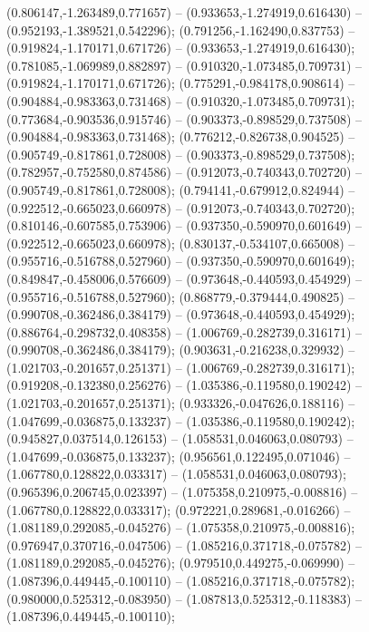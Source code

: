  (0.806147,-1.263489,0.771657) -- (0.933653,-1.274919,0.616430) -- (0.952193,-1.389521,0.542296);
 (0.791256,-1.162490,0.837753) -- (0.919824,-1.170171,0.671726) -- (0.933653,-1.274919,0.616430);
 (0.781085,-1.069989,0.882897) -- (0.910320,-1.073485,0.709731) -- (0.919824,-1.170171,0.671726);
 (0.775291,-0.984178,0.908614) -- (0.904884,-0.983363,0.731468) -- (0.910320,-1.073485,0.709731);
 (0.773684,-0.903536,0.915746) -- (0.903373,-0.898529,0.737508) -- (0.904884,-0.983363,0.731468);
 (0.776212,-0.826738,0.904525) -- (0.905749,-0.817861,0.728008) -- (0.903373,-0.898529,0.737508);
 (0.782957,-0.752580,0.874586) -- (0.912073,-0.740343,0.702720) -- (0.905749,-0.817861,0.728008);
 (0.794141,-0.679912,0.824944) -- (0.922512,-0.665023,0.660978) -- (0.912073,-0.740343,0.702720);
 (0.810146,-0.607585,0.753906) -- (0.937350,-0.590970,0.601649) -- (0.922512,-0.665023,0.660978);
 (0.830137,-0.534107,0.665008) -- (0.955716,-0.516788,0.527960) -- (0.937350,-0.590970,0.601649);
 (0.849847,-0.458006,0.576609) -- (0.973648,-0.440593,0.454929) -- (0.955716,-0.516788,0.527960);
 (0.868779,-0.379444,0.490825) -- (0.990708,-0.362486,0.384179) -- (0.973648,-0.440593,0.454929);
 (0.886764,-0.298732,0.408358) -- (1.006769,-0.282739,0.316171) -- (0.990708,-0.362486,0.384179);
 (0.903631,-0.216238,0.329932) -- (1.021703,-0.201657,0.251371) -- (1.006769,-0.282739,0.316171);
 (0.919208,-0.132380,0.256276) -- (1.035386,-0.119580,0.190242) -- (1.021703,-0.201657,0.251371);
 (0.933326,-0.047626,0.188116) -- (1.047699,-0.036875,0.133237) -- (1.035386,-0.119580,0.190242);
 (0.945827,0.037514,0.126153) -- (1.058531,0.046063,0.080793) -- (1.047699,-0.036875,0.133237);
 (0.956561,0.122495,0.071046) -- (1.067780,0.128822,0.033317) -- (1.058531,0.046063,0.080793);
 (0.965396,0.206745,0.023397) -- (1.075358,0.210975,-0.008816) -- (1.067780,0.128822,0.033317);
 (0.972221,0.289681,-0.016266) -- (1.081189,0.292085,-0.045276) -- (1.075358,0.210975,-0.008816);
 (0.976947,0.370716,-0.047506) -- (1.085216,0.371718,-0.075782) -- (1.081189,0.292085,-0.045276);
 (0.979510,0.449275,-0.069990) -- (1.087396,0.449445,-0.100110) -- (1.085216,0.371718,-0.075782);
 (0.980000,0.525312,-0.083950) -- (1.087813,0.525312,-0.118383) -- (1.087396,0.449445,-0.100110);
